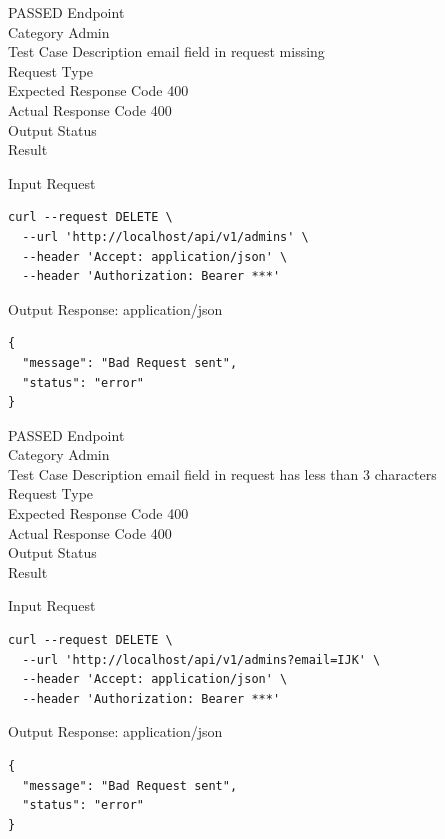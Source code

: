 \begin{testcase}{44}{PASSED}
Endpoint \hfill {}\\
Category \hfill Admin\\
Test Case Description \hfill email field in request missing\\

Request Type    \hfill {}\\
Expected Response Code    \hfill 400\\
Actual Response Code    \hfill 400\\

Output Status \hfill {}\\
Result \hfill {}

\begin{ipblock}{Input Request}
\begin{verbatim}
curl --request DELETE \
  --url 'http://localhost/api/v1/admins' \
  --header 'Accept: application/json' \
  --header 'Authorization: Bearer ***'
\end{verbatim}
\end{ipblock}

\begin{opblock}{Output Response: application/json}
\begin{verbatim}
{
  "message": "Bad Request sent",
  "status": "error"
}
\end{verbatim}
\end{opblock}
\end{testcase}

\begin{testcase}{45}{PASSED}
Endpoint \hfill {}\\
Category \hfill Admin\\
Test Case Description \hfill email field in request has less than 3 characters\\

Request Type    \hfill {}\\
Expected Response Code    \hfill 400\\
Actual Response Code    \hfill 400\\

Output Status \hfill {}\\
Result \hfill \tcstatus{PASSED}

\begin{ipblock}{Input Request}
\begin{verbatim}
curl --request DELETE \
  --url 'http://localhost/api/v1/admins?email=IJK' \
  --header 'Accept: application/json' \
  --header 'Authorization: Bearer ***'
\end{verbatim}
\end{ipblock}

\begin{opblock}{Output Response: application/json}
\begin{verbatim}
{
  "message": "Bad Request sent",
  "status": "error"
}
\end{verbatim}
\end{opblock}
\end{testcase}

